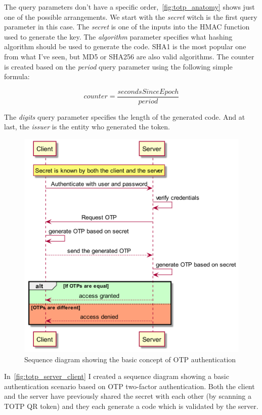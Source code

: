 \documentclass[a4paper,12pt]{report}
\begin{document}
The query parameters don't have a specific order,~\autoref{fig:totp_anatomy}
shows just one of the possible arrangements. We start with the \textit{secret}
witch is the first query parameter in this case. The \textit{secret} is one of
the inputs into the HMAC function used to generate the key. The
\textit{algorithm} parameter specifies what hashing algorithm should be used to
generate the code. SHA1 is the most popular one from what I've seen, but MD5 or
SHA256 are also valid algorithms. The counter is created based on the
\textit{period} query parameter using the following simple formula:

\[counter=\frac{secondsSinceEpoch}{period}\]

The \textit{digits} query parameter specifies the length of the generated code.
And at last, the \textit{issuer} is the entity who generated the token.

\begin{figure}[H]
    \centering
    \includegraphics[scale=0.3]{diagrams/sequence/totp.png}
    \caption{Sequence diagram showing the basic concept of OTP authentication}\label{fig:totp_server_client}
\end{figure}

In~\autoref{fig:totp_server_client} I created a sequence diagram showing a
basic authentication scenario based on OTP two-factor authentication. Both the
client and the server have previously shared the secret with each other (by
scanning a TOTP QR token) and they each generate a code which is validated by
the server.
\end{document}

